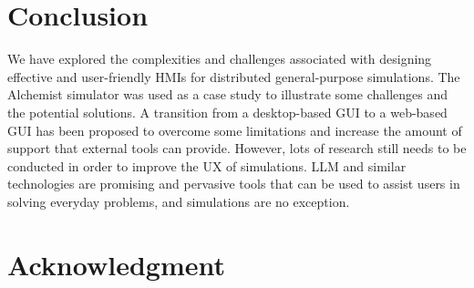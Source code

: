 \documentclass[conference]{IEEEtran}
\begin{document}
\section{Conclusion}
We have explored the complexities and challenges associated with designing effective and user-friendly \acp{HMI} for distributed general-purpose simulations.
%
The Alchemist simulator was used as a case study to illustrate some challenges and the potential solutions.
%
A transition from a desktop-based \ac{GUI} to a web-based \ac{GUI} has been proposed to overcome some limitations and increase the amount of support that external tools can provide.
%
However,
lots of research still needs to be conducted in order to improve the \ac{UX} of simulations.
%
\ac{LLM} and similar technologies are promising and pervasive tools that can be used to assist users in solving everyday problems,
and simulations are no exception.
%
\section*{Acknowledgment}



\vspace{12pt}
\end{document}
